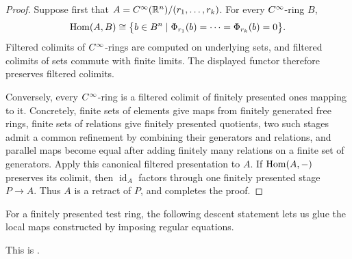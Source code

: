
\begin{proof}
  Suppose first that
  $A=C^\infty(\mathbb{R}^n)/(r_1,\ldots,r_k)$. For every $C^\infty$-ring $B$,
  \[
    \operatorname{Hom}(A,B)
    \cong
    \bigl\{b\in B^n\mid
      \Phi_{r_1}(b)=\cdots=\Phi_{r_k}(b)=0\bigr\}.
  \]
  Filtered colimits of $C^\infty$-rings are computed on underlying sets, and
  filtered colimits of sets commute with finite limits. The displayed functor
  therefore preserves filtered colimits.

  Conversely, every $C^\infty$-ring is a filtered colimit of finitely presented
  ones mapping to it. Concretely, finite sets of elements give maps from
  finitely generated free rings, finite sets of relations give finitely
  presented quotients, two such stages admit a common refinement by combining
  their generators and relations, and parallel maps become equal after adding
  finitely many relations on a finite set of generators. Apply this canonical
  filtered presentation to $A$. If $\operatorname{Hom}(A,-)$ preserves its colimit, then
  $\operatorname{id}_A$ factors through one finitely presented stage
  $P\to A$. Thus $A$ is a retract of $P$, and
   completes the proof.
\end{proof}

For a finitely presented test ring, the following descent statement
lets us glue the local maps constructed by imposing regular equations.


This is \citet[Chapter~I, Lemma~2.7]{Moerdijk_Reyes_Smooth_Infinitesimal_Analysis}.

